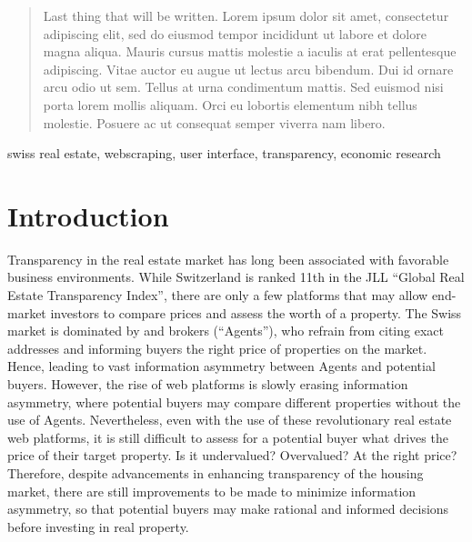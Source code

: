 \documentclass[main]{subfiles}
\begin{document}
\begin{abstract}
Last thing that will be written. Lorem ipsum dolor sit amet, consectetur adipiscing elit, sed do eiusmod tempor incididunt ut labore et dolore magna aliqua. Mauris cursus mattis molestie a iaculis at erat pellentesque adipiscing. Vitae auctor eu augue ut lectus arcu bibendum. Dui id ornare arcu odio ut sem. Tellus at urna condimentum mattis. Sed euismod nisi porta lorem mollis aliquam. Orci eu lobortis elementum nibh tellus molestie. Posuere ac ut consequat semper viverra nam libero. 
\end{abstract}
    
\begin{IEEEkeywords}
swiss real estate, webscraping, user interface, transparency, economic research
\end{IEEEkeywords}
    
\section{Introduction}
Transparency in the real estate market has long been associated with favorable business environments. 
While Switzerland is ranked 11th in the JLL “Global Real Estate Transparency Index”, 
there are only a few platforms that may allow end-market investors to compare prices and assess the worth of a property.
The Swiss market is dominated by  and brokers (“Agents”),
who refrain from citing exact addresses and informing buyers the right price of properties on the market. 
Hence, leading to vast information asymmetry between Agents and potential buyers.
However, the rise of web platforms is slowly erasing information asymmetry, 
where potential buyers may compare different properties without the use of Agents. 
Nevertheless, even with the use of these revolutionary real estate web platforms, 
it is still difficult to assess for a potential buyer what drives the price of their target property. 
Is it undervalued? Overvalued? At the right price?
Therefore, despite advancements in enhancing transparency of the housing market, 
there are still improvements to be made to minimize information asymmetry, 
so that potential buyers may make rational and informed decisions before investing in real property.
\end{document}
